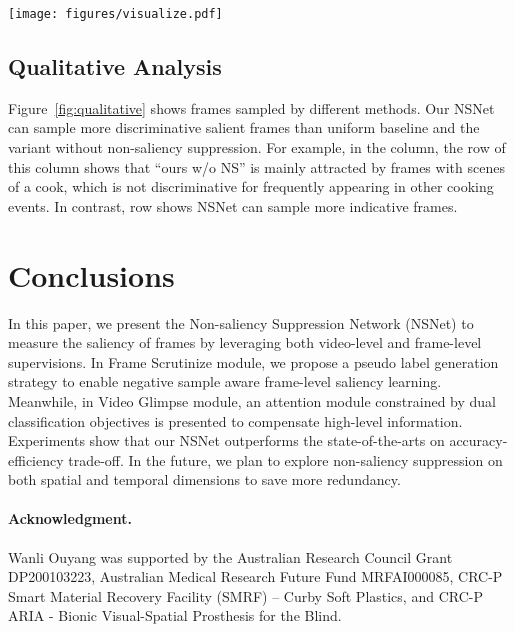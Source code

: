 \documentclass[runningheads]{llncs}
\newcommand{\figref}[1]{Figure~\ref{#1}}
\begin{document}
\begin{figure*}[t]
      \centering \texttt{[image: figures/visualize.pdf]}
      \caption{\textbf{Visualization of selected frames with different variants of our approach.}   row: 
Uniform, 
 row: 
Our approach without NS mechanism (Ours w/o NS),
       row:
Our approach (Ours). Intuitively salient frames are are outlined in \textcolor{Aqua}{aqua} while non-salient ones are outlined in \textcolor{red}{red}. Please zoom in for best view.
}
      \label{fig:qualitative}
\end{figure*} 
\subsection{Qualitative Analysis}
\figref{fig:qualitative} shows frames sampled by different methods. Our NSNet can sample more discriminative salient frames than uniform baseline and the variant without non-saliency suppression. For example, in the  column, the  row of this column shows that ``ours w/o NS'' is mainly attracted by frames with scenes of a cook, which is not discriminative for frequently appearing in other cooking events. In contrast,  row shows NSNet can sample more indicative frames.
\section{Conclusions}
In this paper, we present the Non-saliency Suppression Network (NSNet) to measure the saliency of frames by leveraging both video-level and frame-level supervisions.
In Frame Scrutinize module, we propose a pseudo label generation strategy to enable negative sample aware frame-level saliency learning. Meanwhile, in Video Glimpse module, an attention module constrained by dual classification objectives is presented to compensate high-level information. 
Experiments show that our NSNet outperforms the state-of-the-arts on accuracy-efficiency trade-off. 
In the future, we plan to explore non-saliency suppression on both spatial and temporal dimensions to save more redundancy.



\paragraph{Acknowledgment.} Wanli Ouyang was supported by the Australian Research Council Grant DP200103223, Australian Medical Research Future Fund MRFAI000085,  CRC-P Smart Material Recovery Facility (SMRF) – Curby Soft Plastics, and CRC-P ARIA - Bionic Visual-Spatial Prosthesis for the Blind.
\end{document}
